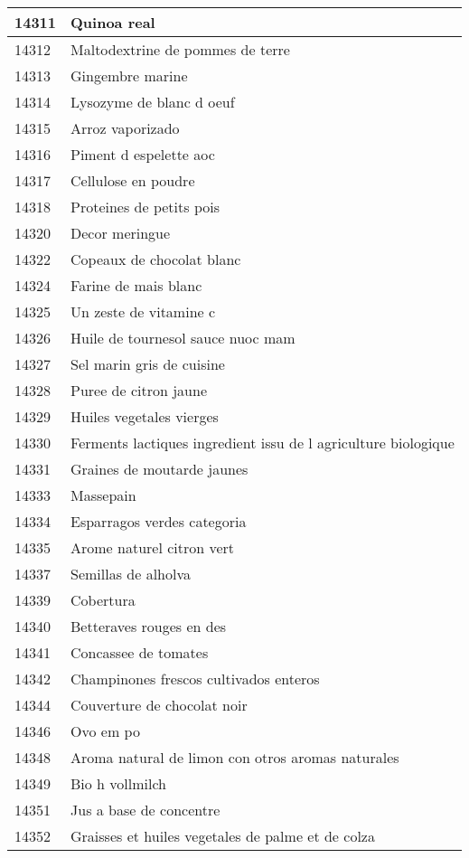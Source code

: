 \begin{longtable}{|l|l|}
14311 & Quinoa real \\ \hline 
14312 & Maltodextrine de pommes de terre \\ \hline 
14313 & Gingembre marine \\ \hline 
14314 & Lysozyme de blanc d oeuf \\ \hline 
14315 & Arroz vaporizado \\ \hline 
14316 & Piment d espelette aoc \\ \hline 
14317 & Cellulose en poudre \\ \hline 
14318 & Proteines de petits pois \\ \hline 
14320 & Decor meringue \\ \hline 
14322 & Copeaux de chocolat blanc \\ \hline 
14324 & Farine de mais blanc \\ \hline 
14325 & Un zeste de vitamine c \\ \hline 
14326 & Huile de tournesol sauce nuoc mam \\ \hline 
14327 & Sel marin gris de cuisine \\ \hline 
14328 & Puree de citron jaune \\ \hline 
14329 & Huiles vegetales vierges \\ \hline 
14330 & Ferments lactiques ingredient issu de l agriculture biologique \\ \hline 
14331 & Graines de moutarde jaunes \\ \hline 
14333 & Massepain \\ \hline 
14334 & Esparragos verdes categoria \\ \hline 
14335 & Arome naturel citron vert \\ \hline 
14337 & Semillas de alholva \\ \hline 
14339 & Cobertura \\ \hline 
14340 & Betteraves rouges en des \\ \hline 
14341 & Concassee de tomates \\ \hline 
14342 & Champinones frescos cultivados enteros \\ \hline 
14344 & Couverture de chocolat noir \\ \hline 
14346 & Ovo em po \\ \hline 
14348 & Aroma natural de limon con otros aromas naturales \\ \hline 
14349 & Bio h vollmilch \\ \hline 
14351 & Jus a base de concentre \\ \hline 
14352 & Graisses et huiles vegetales de palme et de colza \\ \hline 

\end{longtable}
